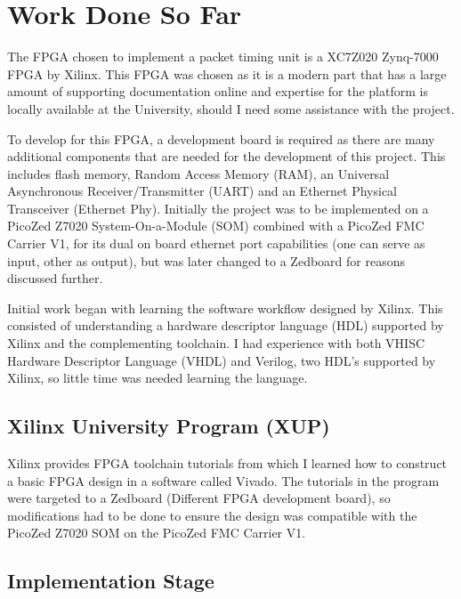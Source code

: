 \chapter{Work Done So Far}\label{C:workDoneSoFar}

\par The FPGA chosen to implement a packet timing unit is a XC7Z020 Zynq-7000 FPGA by Xilinx. This
FPGA was chosen as it is a modern part that has a large amount of supporting documentation online
and expertise for the platform is locally available at the University, should I need some assistance
with the project.

\par To develop for this FPGA, a development board is required as there are many additional components
that are needed for the development of this project. This includes flash memory, Random Access Memory
(RAM), an Universal Asynchronous Receiver/Transmitter (UART) and an Ethernet Physical Transceiver
(Ethernet Phy). Initially the project was to be implemented on a PicoZed Z7020 System-On-a-Module
(SOM) combined with a PicoZed FMC Carrier V1, for its dual on board ethernet port capabilities (one
can serve as input, other as output), but was later changed to a Zedboard for reasons discussed
further.

\par Initial work began with learning the software workflow designed by Xilinx. This consisted of
understanding a hardware descriptor language (HDL) supported by Xilinx and the complementing
toolchain. I had experience with both VHISC Hardware Descriptor Language (VHDL) and Verilog, two
HDL's supported by Xilinx, so little time was needed learning the language.

\section{Xilinx University Program (XUP)}

Xilinx provides FPGA toolchain tutorials from which I learned how to construct a basic FPGA design in
a software called Vivado. The tutorials in the program were targeted to a Zedboard (Different FPGA
development board), so modifications had to be done to ensure the design was compatible with the
PicoZed Z7020 SOM on the PicoZed FMC Carrier V1.

\section{Implementation Stage}

